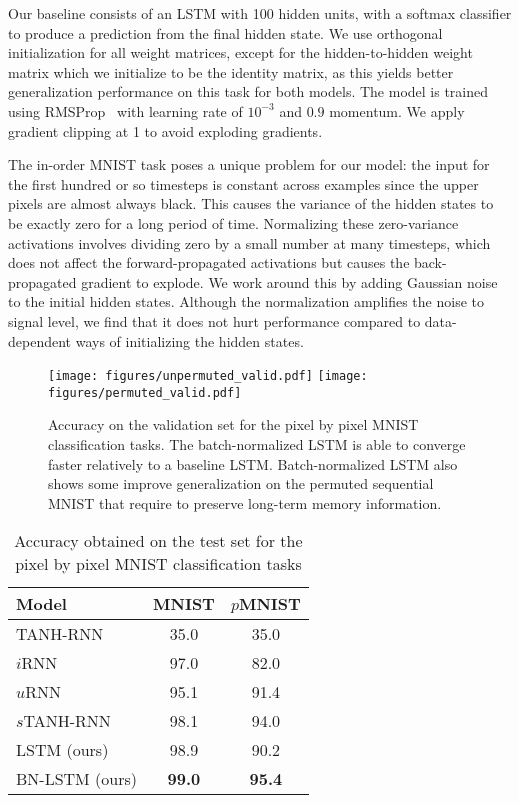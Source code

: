 \documentclass{article} \pdfoutput=1 \usepackage[utf8]{inputenc}
\begin{document}
Our baseline consists of an LSTM with 100 hidden units, with a softmax
classifier to produce a prediction from the final hidden state.  We use
orthogonal initialization for all weight matrices, except for the
hidden-to-hidden weight matrix which we initialize to be the identity matrix,
as this yields better generalization performance on this task for both models.
The model is trained using RMSProp~\citep{rmsprop} with learning rate of
$10^{-3}$ and $0.9$ momentum.  We apply gradient clipping at 1 to avoid
exploding gradients.

The in-order MNIST task poses a unique problem for our model: the input for the
first hundred or so timesteps is constant across examples since the upper
pixels are almost always black.  This causes the variance of the hidden states
to be exactly zero for a long period of time.  Normalizing these zero-variance
activations involves dividing zero by a small number at many timesteps, which
does not affect the forward-propagated activations but causes the
back-propagated gradient to explode.  We work around this by adding Gaussian
noise to the initial hidden states.  Although the normalization amplifies the
noise to signal level, we find that it does not hurt performance compared to
data-dependent ways of initializing the hidden states.


\begin{figure}[!t]
\center
\texttt{[image: figures/unpermuted\_valid.pdf]}
\texttt{[image: figures/permuted\_valid.pdf]}
\caption{Accuracy on the validation set for the pixel by pixel MNIST
classification tasks. The batch-normalized LSTM is able to converge faster
relatively to a baseline LSTM.  Batch-normalized  LSTM also shows some improve
generalization on the permuted sequential MNIST that require to preserve
long-term memory information.}
\label{fig:seqmnist_valid}
\end{figure}



\begin{table}[!hb]
\center
\begin{tabular}{@{}lcc@{}}
  \toprule
  \bf Model & \bf MNIST & \bf $p$MNIST \\
  \midrule
  TANH-RNN~\citep{le2015simple} & 35.0 & 35.0\\
  $i$RNN~\citep{le2015simple} & 97.0 & 82.0\\
  $u$RNN~\citep{urnn} & 95.1 & 91.4\\
  $s$TANH-RNN~\citep{zhang2016architectural} & 98.1 & 94.0\\
  \midrule
  LSTM (ours) & 98.9 & 90.2\\
  BN-LSTM (ours) & \textbf{99.0} & \textbf{95.4}\\
  \bottomrule
\end{tabular}
\caption{Accuracy obtained on the test set for the pixel by pixel MNIST classification tasks}
\label{tab:seqmnist_test}

\end{table}
\end{document}
